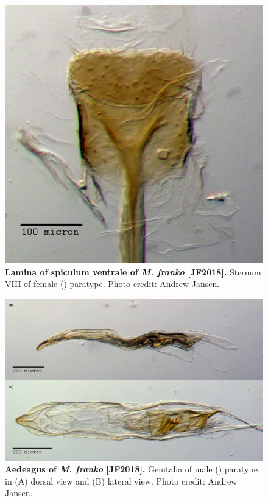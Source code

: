 \documentclass[fleqn,10pt,lineno]{wlpeerj} %
\begin{document}
\begin{figure}[h]
	\centering
	\includegraphics[width=\textwidth]{figure21.jpg}
	\caption{\textbf{Lamina of spiculum ventrale of \textit{M. franko} [JF2018].} Sternum VIII of female (\female) paratype. Photo credit: Andrew Jansen.}
	\label{fig:franko_lamina}
\end{figure}

\begin{figure}[h]
	\centering
	\begin{sideways}
		\includegraphics[width=0.95\textheight]{figure22.jpg}
	\end{sideways}
	\caption{\textbf{Aedeagus of \textit{M. franko} [JF2018].} Genitalia of male (\male) paratype in (A) dorsal view and (B) lateral view. Photo credit: Andrew Jansen.}
	\label{fig:franko_aedeagus}
\end{figure}
\end{document}
